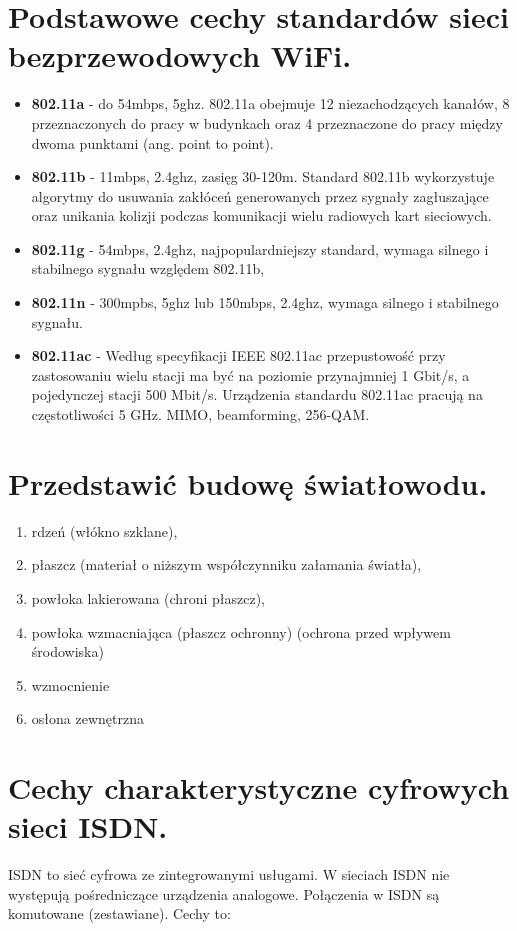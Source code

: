 \documentclass[12pt,a4paper]{article}
\begin{document}
	\section{Podstawowe cechy standardów sieci bezprzewodowych WiFi.}
	\begin{itemize}
		\item \textbf{802.11a} - do 54mbps, 5ghz. 802.11a obejmuje 12 niezachodzących kanałów, 8 przeznaczonych do pracy w budynkach oraz 4 przeznaczone do pracy między dwoma punktami (ang. point to point). 
		\item \textbf{802.11b} - 11mbps, 2.4ghz, zasięg 30-120m. Standard 802.11b wykorzystuje algorytmy do usuwania zakłóceń generowanych przez sygnały zagłuszające oraz unikania kolizji podczas komunikacji wielu radiowych kart sieciowych.
		\item \textbf{802.11g} - 54mbps, 2.4ghz, najpopulardniejszy standard, wymaga silnego i stabilnego sygnału względem 802.11b,
		\item \textbf{802.11n} - 300mpbs, 5ghz lub 150mbps, 2.4ghz, wymaga silnego i stabilnego sygnału.
		\item \textbf{802.11ac} - Według specyfikacji IEEE 802.11ac przepustowość przy zastosowaniu wielu stacji ma być na poziomie przynajmniej 1 Gbit/s, a pojedynczej stacji 500 Mbit/s. Urządzenia standardu 802.11ac pracują na częstotliwości 5 GHz. MIMO, beamforming, 256-QAM.
	\end{itemize}

	\section{Przedstawić budowę światłowodu.}
	\begin{enumerate}
		\item rdzeń (włókno szklane), 
		\item płaszcz (materiał o niższym współczynniku załamania światła), 
		\item powłoka lakierowana (chroni płaszcz), 
		\item powłoka wzmacniająca (płaszcz ochronny) (ochrona przed wpływem środowiska)
		\item wzmocnienie
		\item osłona zewnętrzna
	\end{enumerate}

	\section{Cechy charakterystyczne cyfrowych sieci ISDN.}
	ISDN to sieć cyfrowa ze zintegrowanymi usługami. W sieciach ISDN nie występują pośredniczące urządzenia analogowe. Połączenia w ISDN są komutowane (zestawiane). Cechy to:
	
\end{document}
